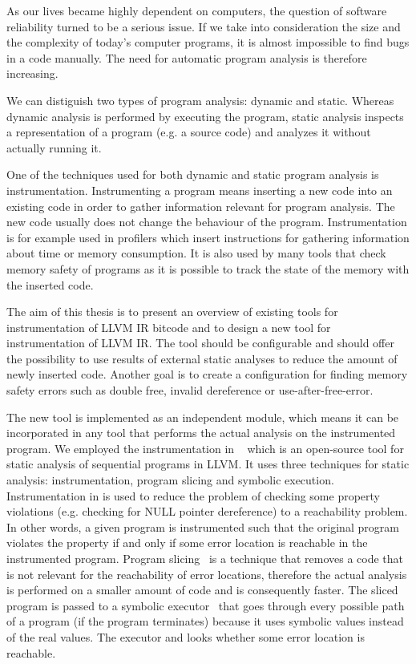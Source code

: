 As our lives became highly dependent on computers, the question of software
reliability turned to be a serious issue. If we take into consideration the
size and the complexity of today's computer programs, it is almost impossible
to find bugs in a code manually. The need for automatic program analysis is
therefore increasing.

We can distiguish two types of program analysis: dynamic and static. Whereas
dynamic analysis is performed by executing the program, static analysis
inspects a representation of a program (e.g. a source code) and analyzes it
without actually running it.

One of the techniques used for both dynamic and static program analysis is
instrumentation. Instrumenting a program means inserting a new code into an
existing code in order to gather information relevant for program analysis. The
new code usually does not change the behaviour of the program. Instrumentation
is for example used in profilers which insert instructions for gathering
information about time or memory consumption. It is also used by many tools
that check memory safety of programs as it is possible to track the state of
the memory with the inserted code.

The aim of this thesis is to present an overview of existing tools for
instrumentation of LLVM IR bitcode and to design a new tool for
instrumentation of LLVM IR. The tool should be configurable and should offer the
possibility to use results of external static analyses to reduce the amount of
newly inserted code. Another goal is to create a configuration for finding
memory safety errors such as double free, invalid dereference or
use-after-free-error.

The new tool is implemented as an independent module, which means it can be
incorporated in any tool that performs the actual analysis on the instrumented
program. We employed the instrumentation in \symbiotic~\cite{Symbiotic} which
is an open-source tool for static analysis of sequential programs in LLVM. It
uses three techniques for static analysis: instrumentation, program slicing and
symbolic execution. Instrumentation in \symbiotic is used to reduce the problem
of checking some property violations (e.g. checking for NULL pointer
dereference) to a reachability problem. In other words, a given program is
instrumented such that the original program violates the property if and only
if some error location is reachable in the instrumented program. Program
slicing~\cite{weiser} is a technique that removes a code that is not
relevant for the reachability of error locations, therefore the actual
analysis is performed on a smaller amount of code and is consequently
faster. The sliced program is passed to a symbolic executor~\cite{King} that goes
through every possible path of a program (if the program terminates)
because it uses symbolic values instead of the real values. The executor and
looks whether some error location is reachable.


